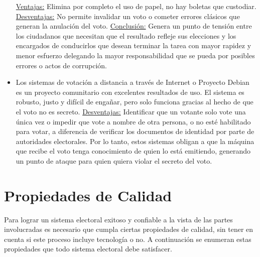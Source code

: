 \begin{itemize}
    \underline{Ventajas:} Elimina por completo el uso de papel, no hay boletas que custodiar.\newline
    \underline{Desventajas:} No permite invalidar un voto o cometer errores clásicos que generan la anulación del voto.\newline
    \underline{Conclusión:} Genera un punto de tensión entre los ciudadanos que necesitan que el resultado refleje sus elecciones y los encargados de conducirlos que desean terminar la tarea con mayor rapidez y menor esfuerzo delegando la mayor responsabilidad que se pueda por posibles errores o actos de corrupción.
    \item Los sistemas de votación a distancia a través de Internet o Proyecto Debian es un proyecto comunitario con excelentes resultados de uso. El sistema es robusto, justo y difícil de engañar, pero solo funciona gracias al hecho de que el voto no es secreto.\newline
    \underline{Desventajas:} Identificar que un votante solo vote una única vez o impedir que vote a nombre de otra persona, o no esté habilitado para votar, a diferencia de verificar los documentos de identidad por parte de autoridades electorales. Por lo tanto, estos sistemas obligan a que la máquina que recibe el voto tenga conocimiento de quien lo está emitiendo, generando un punto de ataque para quien quiera violar el secreto del voto.
\end{itemize}


\section{Propiedades de Calidad}
Para lograr un sistema electoral exitoso y confiable a la vista de las partes involucradas es necesario que cumpla ciertas propiedades de calidad, sin tener en cuenta si este proceso incluye tecnología o no. A continuación se enumeran estas propiedades que todo sistema electoral debe satisfacer.


